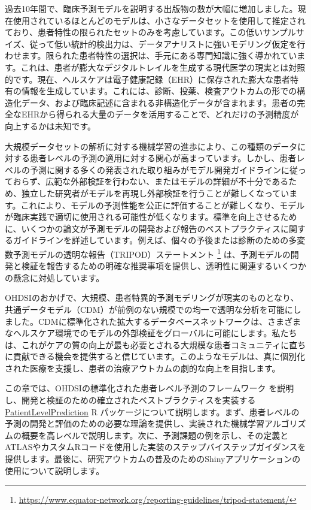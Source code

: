 \documentclass[
  11pt]{book}
\theoremstyle{definition}
\theoremstyle{definition}
\theoremstyle{definition}
\theoremstyle{definition}
\theoremstyle{remark}
\begin{document}
過去10年間で、臨床予測モデルを説明する出版物の数が大幅に増加しました。現在使用されているほとんどのモデルは、小さなデータセットを使用して推定されており、患者特性の限られたセットのみを考慮しています。この低いサンプルサイズ、従って低い統計的検出力は、データアナリストに強いモデリング仮定を行わせます。限られた患者特性の選択は、手元にある専門知識に強く導かれています。これは、患者が膨大なデジタルトレイルを生成する現代医学の現実とは対照的です。現在、ヘルスケアは電子健康記録（EHR）に保存された膨大な患者特有の情報を生成しています。これには、診断、投薬、検査アウトカムの形での構造化データ、および臨床記述に含まれる非構造化データが含まれます。患者の完全なEHRから得られる大量のデータを活用することで、どれだけの予測精度が向上するかは未知です。 

大規模データセットの解析に対する機械学習の進歩により、この種類のデータに対する患者レベルの予測の適用に対する関心が高まっています。しかし、患者レベルの予測に関する多くの発表された取り組みがモデル開発ガイドラインに従っておらず、広範な外部検証を行わない、またはモデルの詳細が不十分であるため、独立した研究者がモデルを再現し外部検証を行うことが難しくなっています。これにより、モデルの予測性能を公正に評価することが難しくなり、モデルが臨床実践で適切に使用される可能性が低くなります。標準を向上させるために、いくつかの論文が予測モデルの開発および報告のベストプラクティスに関するガイドラインを詳述しています。例えば、個々の予後または診断のための多変数予測モデルの透明な報告（TRIPOD）ステートメント \footnote{\url{https://www.equator-network.org/reporting-guidelines/tripod-statement/}} は、予測モデルの開発と検証を報告するための明確な推奨事項を提供し、透明性に関連するいくつかの懸念に対処しています。  

OHDSIのおかげで、大規模、患者特異的予測モデリングが現実のものとなり、共通データモデル（CDM）が前例のない規模での均一で透明な分析を可能にしました。CDMに標準化された拡大するデータベースネットワークは、さまざまなヘルスケア環境でのモデルの外部検証をグローバルに可能にします。私たちは、これがケアの質の向上が最も必要とされる大規模な患者コミュニティに直ちに貢献できる機会を提供すると信じています。このようなモデルは、真に個別化された医療を支援し、患者の治療アウトカムの劇的な向上を目指します。

この章では、OHDSIの標準化された患者レベル予測のフレームワーク \citep{reps2018} を説明し、開発と検証のための確立されたベストプラクティスを実装する \href{https://ohdsi.github.io/PatientLevelPrediction/}{PatientLevelPrediction} R パッケージについて説明します。まず、患者レベルの予測の開発と評価のための必要な理論を提供し、実装された機械学習アルゴリズムの概要を高レベルで説明します。次に、予測課題の例を示し、その定義とATLASやカスタムRコードを使用した実装のステップバイステップガイダンスを提供します。最後に、研究アウトカムの普及のためのShinyアプリケーションの使用について説明します。
\end{document}
